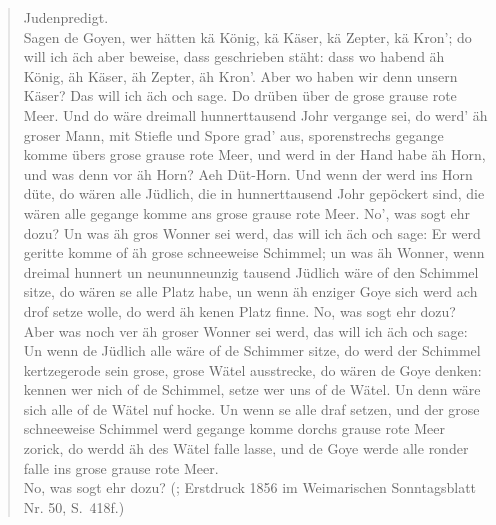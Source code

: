  \begin{quote}

Judenpredigt.\\
Sagen de Goyen, wer hätten kä König, kä Käser, kä Zepter, kä Kron’; do will ich äch aber beweise, dass geschrieben stäht: dass wo habend äh König, äh Käser, äh Zepter, äh Kron’. Aber wo haben wir denn unsern Käser? Das will ich äch och sage. Do drüben über de grose grause rote Meer. Und do wäre dreimall hunnerttausend Johr vergange sei, do werd’ äh groser Mann, mit Stiefle und Spore grad’ aus, sporenstrechs gegange komme übers grose grause rote Meer, und werd in der Hand habe äh Horn, und was denn vor äh Horn? Aeh Düt-Horn. Und wenn der werd ins Horn düte, do wären alle Jüdlich, die in hunnerttausend Johr gepöckert sind, die wären alle gegange komme ans grose grause rote Meer. No’, was sogt ehr dozu? Un was äh gros Wonner sei werd, das will ich äch och sage: Er werd geritte komme of äh grose schneeweise Schimmel; un was äh Wonner, wenn dreimal hunnert un neununneunzig tausend Jüdlich wäre of den Schimmel sitze, do wären se alle Platz habe, un wenn äh enziger Goye sich werd ach drof setze wolle, do werd äh kenen Platz finne. No, was sogt ehr dozu? Aber was noch ver äh groser Wonner sei werd, das will ich äch och sage: Un wenn de Jüdlich alle wäre of de Schimmer sitze, do werd der Schimmel kertzegerode sein grose, grose Wätel ausstrecke, do wären de Goye denken: kennen wer nich of de Schimmel, setze wer uns of de Wätel. Un denn wäre sich alle of de Wätel nuf hocke. Un wenn se alle draf setzen, und der grose schneeweise Schimmel werd gegange komme dorchs grause rote Meer zorick, do werdd äh des Wätel falle lasse, und de Goye werde alle ronder falle ins grose grause rote Meer. \\ No, was sogt ehr dozu?
 (\citealt[1086]{GoetheJudenpredigt}; Erstdruck 1856 im Weimarischen Sonntagsblatt Nr. 50, S.\, 418f.) %
  \end{quote}

